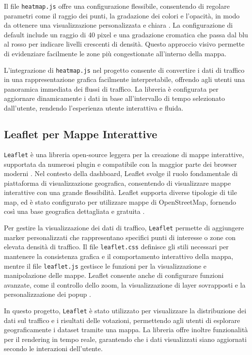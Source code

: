 Il file \texttt{heatmap.js} offre una configurazione flessibile, consentendo di regolare parametri come il raggio dei punti, la gradazione dei colori e l’opacità, in modo da ottenere una visualizzazione personalizzata e chiara \cite{spence2007information}. La configurazione di default include un raggio di 40 pixel e una gradazione cromatica che passa dal blu al rosso per indicare livelli crescenti di densità. Questo approccio visivo permette di evidenziare facilmente le zone più congestionate all’interno della mappa.

L’integrazione di \texttt{heatmap.js} nel progetto consente di convertire i dati di traffico in una rappresentazione grafica facilmente interpretabile, offrendo agli utenti una panoramica immediata dei flussi di traffico. La libreria è configurata per aggiornare dinamicamente i dati in base all’intervallo di tempo selezionato dall’utente, rendendo l’esperienza utente interattiva e fluida.

\subsection{Leaflet per Mappe Interattive}
\texttt{Leaflet} è una libreria open-source leggera per la creazione di mappe interattive, supportata da numerosi plugin e compatibile con la maggior parte dei browser moderni \cite{leaflet_docs}. Nel contesto della dashboard, Leaflet svolge il ruolo fondamentale di piattaforma di visualizzazione geografica, consentendo di visualizzare mappe interattive con una grande flessibilità. Leaflet supporta diverse tipologie di tile map, ed è stato configurato per utilizzare mappe di OpenStreetMap, fornendo così una base geografica dettagliata e gratuita \cite{haklay2008openstreetmap}.

Per gestire la visualizzazione dei dati di traffico, \texttt{Leaflet} permette di aggiungere marker personalizzati che rappresentano specifici punti di interesse o zone con elevata densità di traffico. Il file \texttt{leaflet.css} definisce gli stili necessari per mantenere la consistenza grafica e il comportamento interattivo della mappa, mentre il file \texttt{leaflet.js} gestisce le funzioni per la visualizzazione e manipolazione delle mappe. Leaflet consente anche di configurare funzioni avanzate, come il controllo dello zoom, la visualizzazione di layer sovrapposti e la personalizzazione dei popup \cite{peterson2014interactive}.

In questo progetto, \texttt{Leaflet} è stato utilizzato per visualizzare la distribuzione dei dati sul traffico e i risultati delle votazioni, permettendo agli utenti di esplorare geograficamente i dataset tramite una mappa. La libreria offre inoltre funzionalità per il rendering in tempo reale, garantendo che i dati visualizzati siano aggiornati secondo le interazioni dell'utente.

